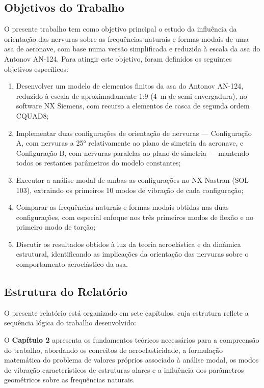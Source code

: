 \documentclass[a4paper,fleqn]{cas-sc}
\begin{document}
\subsection{Objetivos do Trabalho}

O presente trabalho tem como objetivo principal o estudo da influência da orientação das nervuras sobre as frequências naturais e formas modais de uma asa de aeronave, com base numa versão simplificada e reduzida à escala da asa do Antonov AN-124. Para atingir este objetivo, foram definidos os seguintes objetivos específicos:

\begin{enumerate}
    \item Desenvolver um modelo de elementos finitos da asa do Antonov AN-124, reduzido à escala de aproximadamente 1:9 (\SI{4}{\meter} de semi-envergadura), no software NX Siemens, com recurso a elementos de casca de segunda ordem CQUAD8;

    \item Implementar duas configurações de orientação de nervuras --- Configuração A, com nervuras a 25° relativamente ao plano de simetria da aeronave, e Configuração B, com nervuras paralelas ao plano de simetria --- mantendo todos os restantes parâmetros do modelo constantes;

    \item Executar a análise modal de ambas as configurações no NX Nastran (SOL 103), extraindo os primeiros 10 modos de vibração de cada configuração;

    \item Comparar as frequências naturais e formas modais obtidas nas duas configurações, com especial enfoque nos três primeiros modos de flexão e no primeiro modo de torção;

    \item Discutir os resultados obtidos à luz da teoria aeroelástica e da dinâmica estrutural, identificando as implicações da orientação das nervuras sobre o comportamento aeroelástico da asa.
\end{enumerate}

\subsection{Estrutura do Relatório}

O presente relatório está organizado em sete capítulos, cuja estrutura reflete a sequência lógica do trabalho desenvolvido:

O \textbf{Capítulo 2} apresenta os fundamentos teóricos necessários para a compreensão do trabalho, abordando os conceitos de aeroelasticidade, a formulação matemática do problema de valores próprios associado à análise modal, os modos de vibração característicos de estruturas alares e a influência dos parâmetros geométricos sobre as frequências naturais.
\end{document}
